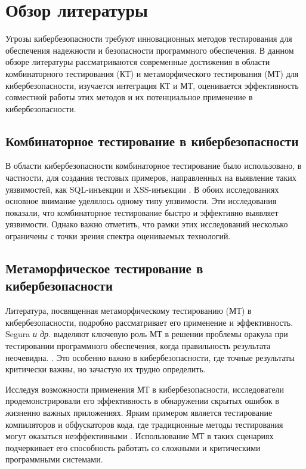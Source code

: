 \chapter{Обзор литературы}
\label{chap:background}


Угрозы кибербезопасности требуют инновационных методов тестирования для обеспечения надежности и безопасности программного обеспечения. В данном обзоре литературы рассматриваются современные достижения в области комбинаторного тестирования (КТ) и метаморфического тестирования (МТ) для кибербезопасности, изучается интеграция КТ и МТ, оценивается эффективность совместной работы этих методов и их потенциальное применение в кибербезопасности.

\section{Комбинаторное тестирование в кибербезопасности}\label{sec:combinatorial-testing-in-cybersecurity}

В области кибербезопасности комбинаторное тестирование было использовано, в частности, для создания тестовых примеров, направленных на выявление таких уязвимостей, как SQL-инъекции \cite{Simos2019SQL} и XSS-инъекции \cite{Garn2014XSS}. В обоих исследованиях основное внимание уделялось одному типу уязвимости. Эти исследования показали, что комбинаторное тестирование быстро и эффективно выявляет уязвимости. Однако важно отметить, что рамки этих исследований несколько ограничены с точки зрения спектра оцениваемых технологий.


\section{Метаморфическое тестирование в кибербезопасности}\label{sec:metamorphic-testing-in-cybersecurity}

Литература, посвященная метаморфическому тестированию (МТ) в кибербезопасности, подробно рассматривает его применение и эффективность. Segura \textit{и др.} выделяют ключевую роль МТ в решении проблемы оракула при тестировании программного обеспечения, когда правильность результата неочевидна. \cite{CybersecurityMT}. Это особенно важно в кибербезопасности, где точные результаты критически важны, но зачастую их трудно определить.

Исследуя возможности применения МТ в кибербезопасности, исследователи продемонстрировали его эффективность в обнаружении скрытых ошибок в жизненно важных приложениях. Ярким примером является тестирование компиляторов и обфускаторов кода, где традиционные методы тестирования могут оказаться неэффективными \cite{CybersecurityMT} \cite{GLSLFuzz}. Использование МТ в таких сценариях подчеркивает его способность работать со сложными и критическими программными системами.

